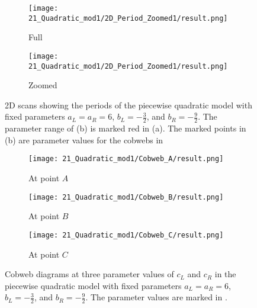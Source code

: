 \begin{figure}
	\centering
	\begin{subfigure}{0.3\textwidth}
		\centering
		\texttt{[image: 21\_Quadratic\_mod1/2D\_Period\_Zoomed1/result.png]}
		\caption{Full}
		\label{fig:setup.quad.even.period.full}
	\end{subfigure}
	\begin{subfigure}{0.3\textwidth}
		\centering
		\texttt{[image: 21\_Quadratic\_mod1/2D\_Period\_Zoomed1/result.png]}
		\caption{Zoomed}
		\label{fig:setup.quad.even.period.zoomed}
	\end{subfigure}
	\caption[2D scans showing periods of the even quadratic model]{
		2D scans showing the periods of the piecewise quadratic model with fixed parameters $a_L = a_R = 6$, $b_L = -\frac{3}{2}$, and $b_R = -\frac{9}{2}$.
		The parameter range of (b) is marked red in (a).
		The marked points in (b) are parameter values for the cobwebs in 
	}
\end{figure}

\begin{figure}
	\centering
	\begin{subfigure}{0.3\textwidth}
		\centering
		\texttt{[image: 21\_Quadratic\_mod1/Cobweb\_A/result.png]}
		\caption{At point $A$}
		\label{fig:setup.quad.even.cobweb.A}
	\end{subfigure}
	\begin{subfigure}{0.3\textwidth}
		\centering
		\texttt{[image: 21\_Quadratic\_mod1/Cobweb\_B/result.png]}
		\caption{At point $B$}
		\label{fig:setup.quad.even.cobweb.B}
	\end{subfigure}
	\begin{subfigure}{0.3\textwidth}
		\centering
		\texttt{[image: 21\_Quadratic\_mod1/Cobweb\_C/result.png]}
		\caption{At point $C$}
		\label{fig:setup.quad.even.cobweb.C}
	\end{subfigure}
	\caption[Cobwebs of the even quadratic model]{
		Cobweb diagrams at three parameter values of $c_L$ and $c_R$ in the piecewise quadratic model with fixed parameters $a_L = a_R = 6$, $b_L = -\frac{3}{2}$, and $b_R = -\frac{9}{2}$.
		The parameter values are marked in .
	}
	\label{fig:setup.quad.even.cobwebs}
\end{figure}
